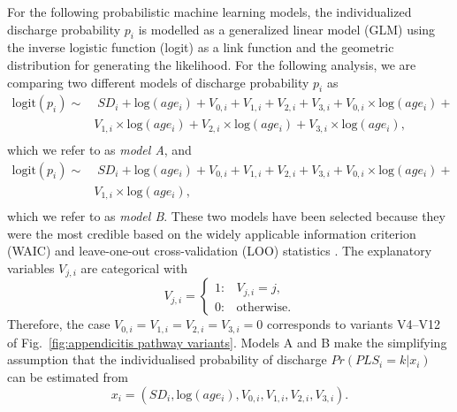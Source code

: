 For the following probabilistic machine learning models, the individualized discharge probability $p_i$ is modelled as a generalized linear model (GLM) using the inverse logistic function (logit) as a link function and the geometric distribution for generating the likelihood. 
For the following analysis, we are comparing two different models of
discharge probability $p_i$ as
\begin{equation}\label{modelA}
  \begin{split}
  \text{logit}(p_i) \sim & \;SD_i + \text{log}(age_i) + 
                            V_{0,i} + V_{1,i} + V_{2,i} + V_{3,i} + V_{0,i}\times\text{log}(age_i) +\\
  &   V_{1,i}\times\text{log}(age_i) + V_{2,i}\times\text{log}(age_i) + V_{3,i}\times\text{log}(age_i),\\
  \end{split}
\end{equation}
which we refer to as \textit{model A}, and
\begin{equation}\label{modelB}
  \begin{split}
  \text{logit}(p_i) \sim & \;SD_i + \text{log}(age_i) +
                                                         V_{0,i} + V_{1,i} + V_{2,i} + V_{3,i} + V_{0,i}\times\text{log}(age_i) +\\
  &    V_{1,i}\times\text{log}(age_i),\\
  \end{split}
\end{equation}
which we refer to as \textit{model B}.
These two models have been selected because they were the most
credible based on the widely applicable information criterion
(WAIC) and leave-one-out cross-validation (LOO) statistics
\cite{Vehtari2017_WAIC_LOO}.
The explanatory variables $V_{j,i}$ are categorical with 
\begin{equation}
V_{j,i} = \begin{cases}
	1: & V_{j,i} = j,\\
        0: & \text{otherwise}.
\end{cases}
\end{equation}
Therefore, the case $V_{0,i}=V_{1,i}=V_{2,i}=V_{3,i}=0$ corresponds to variants V4--V12 of Fig.~\ref{fig:appendicitis pathway variants}.
Models A and B make the simplifying assumption that the individualised
probability of discharge $Pr(PLS_i=k|x_i)$ can be estimated from 
\begin{equation}
x_i = (SD_i, \text{log}(age_i), V_{0,i}, V_{1, i}, V_{2, i}, V_{3, i}).
\end{equation}

